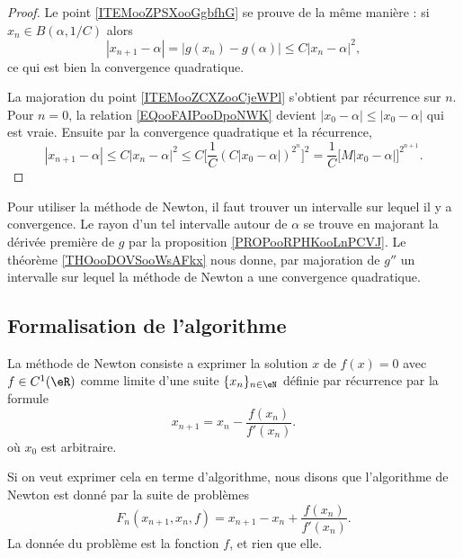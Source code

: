 \begin{proof}
    Le point \ref{ITEMooZPSXooGgbfhG} se prouve de la même manière : si \( x_n\in B(\alpha,1/C)\) alors
    \begin{equation}
        | x_{n+1}-\alpha |=| g(x_n)-g(\alpha) |\leq C| x_n-\alpha |^2,
    \end{equation}
    ce qui est bien la convergence quadratique.

    La majoration du point \ref{ITEMooZCXZooCjeWPl} s'obtient par récurrence sur \( n\). Pour \( n=0\), la relation \eqref{EQooFAIPooDpoNWK} devient \( | x_0-\alpha |\leq | x_0-\alpha |\) qui est vraie. Ensuite par la convergence quadratique et la récurrence,
    \begin{equation}
        | x_{n+1}-\alpha |\leq C| x_n-\alpha |^2\leq C\big[  \frac{1}{ C }(C| x_0-\alpha |)^{2^n}  \big]^2=\frac{1}{ C }\big[ M| x_0-\alpha | \big]^{2^{n+1}}.
    \end{equation}
\end{proof}

Pour utiliser la méthode de Newton, il faut trouver un intervalle sur lequel il y a convergence. Le rayon d'un tel intervalle autour de \( \alpha\) se trouve en majorant la dérivée première de \( g\) par la proposition \ref{PROPooRPHKooLnPCVJ}. Le théorème \ref{THOooDOVSooWsAFkx} nous donne, par majoration de \( g''\) un intervalle sur lequel la méthode de Newton a une convergence quadratique.

\subsection{Formalisation de l'algorithme}


La méthode de Newton consiste a exprimer la solution $x$ de $f(x)=0$ avec $f\in C^1(\eR)$ comme limite d'une suite $\{x_n\}_{n\in\eN}$ définie par récurrence par la formule
\begin{equation}
	x_{n+1}=x_n-\frac{f(x_n)}{f'(x_n)}.
\end{equation}
où $x_0$ est arbitraire.

Si on veut exprimer cela en terme d'algorithme, nous disons que l'algorithme de Newton est donné par la suite de problèmes
\begin{equation}        \label{EqFPourNewtonUn}
	F_n(x_{n+1},x_n,f)=x_{n+1}-x_n+\frac{ f(x_n) }{ f'(x_n) }.
\end{equation}
La donnée du problème est la fonction $f$, et rien que elle.

